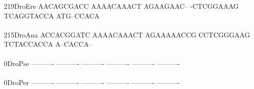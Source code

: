 \documentclass[11pt,twoside,reqno,a4paper]{article}
\begin{document}
{219\hspace*{2\charwidth}DroEre	AACAGCGACC	AAAACAAACT	AGAAGAAC--	-CTCGGAAAG	TCAGGTACCA	ATG--CCACA	\\
\hspace*{5\charwidth}\hspace*{7\charwidth}\hspace*{1\charwidth}\hspace*{1\charwidth}\hspace*{1\charwidth}\hspace*{1\charwidth}\hspace*{1\charwidth}\hspace*{1\charwidth}\\
215\hspace*{2\charwidth}DroAna	ACCACGGATC	AAAACAAACT	AGAAAAACCG	CCTCGGGAAG	TCTACCACCA	A--CACCA--	\\
\hspace*{5\charwidth}\hspace*{7\charwidth}\hspace*{1\charwidth}\hspace*{1\charwidth}\hspace*{1\charwidth}\hspace*{1\charwidth}\hspace*{1\charwidth}\hspace*{1\charwidth}\\
0\hspace*{4\charwidth}DroPse	----------	----------	----------	----------	----------	----------	\\
\hspace*{5\charwidth}\hspace*{7\charwidth}\hspace*{1\charwidth}\hspace*{1\charwidth}\hspace*{1\charwidth}\hspace*{1\charwidth}\hspace*{1\charwidth}\hspace*{1\charwidth}\\
0\hspace*{4\charwidth}DroPer	----------	----------	----------	----------	----------	----------	\\
\hspace*{5\charwidth}\hspace*{7\charwidth}\hspace*{1\charwidth}\hspace*{1\charwidth}\hspace*{1\charwidth}\hspace*{1\charwidth}\hspace*{1\charwidth}\hspace*{1\charwidth}\\
}
\end{document}
